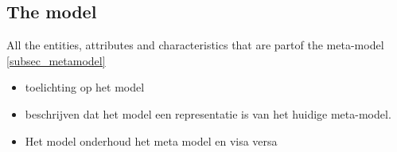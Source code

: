 \subsection{The model} \label{subsec_artifact_model}

All the entities, attributes and characteristics that are partof the meta-model \ref{subsec_metamodel}


\begin{itemize}
    \item toelichting op het model
    \item beschrijven dat het model een representatie is van het
    huidige meta-model.
    \item Het model onderhoud het meta model en visa versa
\end{itemize}